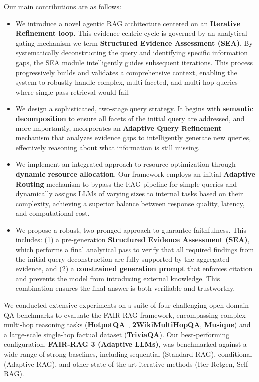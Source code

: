 \documentclass[11pt]{article}
\begin{document}
Our main contributions are as follows:
\begin{itemize}
    \item We introduce a novel agentic RAG architecture centered on an \textbf{Iterative Refinement loop}. This evidence-centric cycle is governed by an analytical gating mechanism we term \textbf{Structured Evidence Assessment (SEA)}. By systematically deconstructing the query and identifying specific information gaps, the SEA module intelligently guides subsequent iterations. This process progressively builds and validates a comprehensive context, enabling the system to robustly handle complex, multi-faceted, and multi-hop queries where single-pass retrieval would fail.
    
    \item We design a sophisticated, two-stage query strategy. It begins with \textbf{semantic decomposition} to ensure all facets of the initial query are addressed, and more importantly, incorporates an \textbf{Adaptive Query Refinement} mechanism that analyzes evidence gaps to intelligently generate new queries, effectively reasoning about what information is still missing.
    
    \item We implement an integrated approach to resource optimization through \textbf{dynamic resource allocation}. Our framework employs an initial \textbf{Adaptive Routing} mechanism to bypass the RAG pipeline for simple queries and dynamically assigns LLMs of varying sizes to internal tasks based on their complexity, achieving a superior balance between response quality, latency, and computational cost.

    \item     We propose a robust, two-pronged approach to guarantee faithfulness. This includes: (1) a pre-generation \textbf{Structured Evidence Assessment (SEA)}, which performs a final analytical pass to verify that all required findings from the initial query deconstruction are fully supported by the aggregated evidence, and (2) a \textbf{constrained generation prompt} that enforces citation and prevents the model from introducing external knowledge. This combination ensures the final answer is both verifiable and trustworthy.
\end{itemize}

We conducted extensive experiments on a suite of four challenging open-domain QA benchmarks to evaluate the FAIR-RAG framework, encompassing complex multi-hop reasoning tasks (\textbf{HotpotQA}~\cite{yang2018hotpotqa}, \textbf{2WikiMultiHopQA}, \textbf{Musique}) and a large-scale single-hop factual dataset (\textbf{TriviaQA}). Our best-performing configuration, \textbf{FAIR-RAG 3 (Adaptive LLMs)}, was benchmarked against a wide range of strong baselines, including sequential (Standard RAG), conditional (Adaptive-RAG), and other state-of-the-art iterative methods (Iter-Retgen, Self-RAG).
\end{document}
